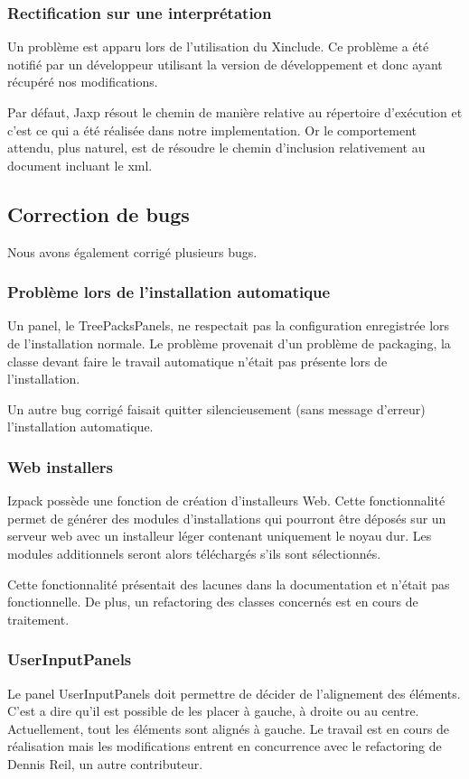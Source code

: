 \subsubsection{Rectification sur une interprétation}
Un problème est apparu lors de l'utilisation du Xinclude.
Ce problème a été notifié par un développeur utilisant la version de développement et donc ayant récupéré nos modifications.

Par défaut, Jaxp résout le chemin de manière relative au répertoire d'exécution et c'est ce qui a été réalisée dans notre implementation.
Or le comportement attendu, plus naturel, est de résoudre le chemin d'inclusion relativement au document incluant le xml.

\subsection{Correction de bugs}
Nous avons également corrigé plusieurs bugs.
\subsubsection{Problème lors de l'installation automatique}
Un panel, le TreePacksPanels, ne respectait pas la configuration enregistrée lors de l'installation normale.
Le problème provenait d'un problème de packaging, la classe devant faire le travail automatique n'était pas présente lors de l'installation.

Un autre bug corrigé faisait quitter silencieusement (sans message d'erreur) l'installation automatique.
\subsubsection{Web installers}
Izpack possède une fonction de création d'installeurs Web.
Cette fonctionnalité permet de générer des modules d'installations qui pourront être déposés sur un serveur web avec un installeur léger contenant uniquement le noyau dur.
Les modules additionnels seront alors téléchargés s'ils sont sélectionnés.

Cette fonctionnalité présentait des lacunes dans la documentation et n'était pas fonctionnelle.
De plus, un refactoring des classes concernés est en cours de traitement.
\subsubsection{UserInputPanels}
Le panel UserInputPanels doit permettre de décider de l'alignement des éléments.
C'est a dire qu'il est possible de les placer à gauche, à droite ou au centre. Actuellement, tout les éléments sont alignés à gauche.
Le travail est en cours de réalisation mais les modifications entrent en concurrence avec le refactoring de Dennis Reil, un autre contributeur.

